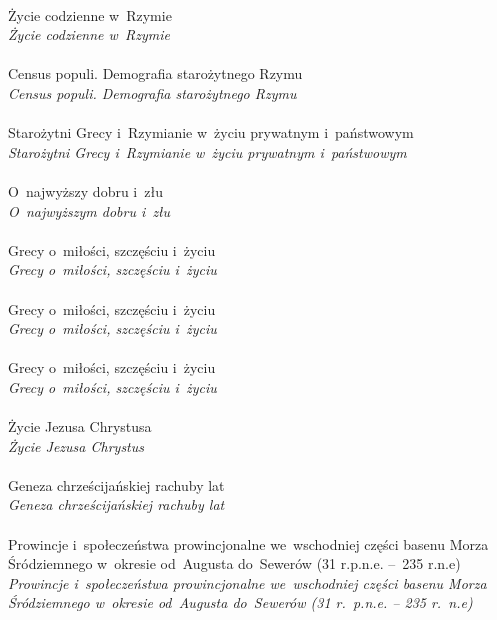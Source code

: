\documentclass[a4paper,11pt]{article}
\begin{document}
 \\
\Jest  Życie codzienne w~Rzymie \\
\Powin \emph{Życie codzienne w~Rzymie} \\
 \\
\Jest  Census populi. Demografia starożytnego Rzymu \\
\Powin \emph{Census populi. Demografia starożytnego Rzymu} \\
 \\
\Jest  Starożytni Grecy i~Rzymianie w~życiu prywatnym i~państwowym \\
\Powin \emph{Starożytni Grecy i~Rzymianie w~życiu prywatnym
  i~państwowym} \\
 \\
\Jest  O~najwyższy dobru i~złu \\
\Powin \emph{O~najwyższym dobru i~złu} \\
 \\
\Jest  Grecy o~miłości, szczęściu i~życiu \\
\Powin \emph{Grecy o~miłości, szczęściu i~życiu} \\
 \\
\Jest  Grecy o~miłości, szczęściu i~życiu \\
\Powin \emph{Grecy o~miłości, szczęściu i~życiu} \\
 \\
\Jest  Grecy o~miłości, szczęściu i~życiu \\
\Powin \emph{Grecy o~miłości, szczęściu i~życiu} \\
 \\
\Jest  Życie Jezusa Chrystusa \\
\Powin \emph{Życie Jezusa Chrystus} \\
 \\
\Jest  Geneza chrześcijańskiej rachuby lat \\
\Powin \emph{Geneza chrześcijańskiej rachuby lat} \\
 \\
\Jest Prowincje i~społeczeństwa prowincjonalne we~wschodniej części
basenu Morza Śródziemnego w~okresie od~Augusta do~Sewerów
(31 r.p.n.e. --~235 r.n.e) \\
\Powin \emph{Prowincje i~społeczeństwa prowincjonalne we~wschodniej
  części basenu Morza Śródziemnego w~okresie od~Augusta do~Sewerów
  (31 r.~p.n.e. -- 235 r.~n.e)} \\
 \\
\end{document}
